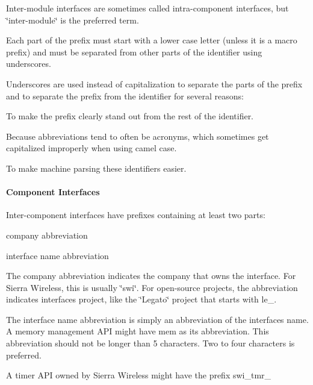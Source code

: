 Inter-\/module interfaces are sometimes called intra-\/component interfaces, but \char`\"{}inter-\/module\char`\"{} is the preferred term.

Each part of the prefix must start with a lower case letter (unless it is a macro prefix) and must be separated from other parts of the identifier using underscores.

Underscores are used instead of capitalization to separate the parts of the prefix and to separate the prefix from the identifier for several reasons\+:


\begin{DoxyItemize}
\item To make the prefix clearly stand out from the rest of the identifier.
\item Because abbreviations tend to often be acronyms, which sometimes get capitalized improperly when using camel case.
\item To make machine parsing these identifiers easier.
\end{DoxyItemize}\hypertarget{ccoding_stds_naming_cstdsInterComponentInterfaces}{}\paragraph{Component Interfaces}\label{ccoding_stds_naming_cstdsInterComponentInterfaces}
Inter-\/component interfaces have prefixes containing at least two parts\+:


\begin{DoxyItemize}
\item company abbreviation
\item interface name abbreviation
\end{DoxyItemize}

The company abbreviation indicates the company that owns the interface. For Sierra Wireless, this is usually \char`\"{}swi\char`\"{}. For open-\/source projects, the abbreviation indicates interface\textquotesingle{}s project, like the \char`\"{}\+Legato\char`\"{} project that starts with {\ttfamily le\+\_\+}.

The interface name abbreviation is simply an abbreviation of the interface\textquotesingle{}s name. A memory management A\+P\+I might have {\ttfamily mem} as its abbreviation. This abbreviation should not be longer than 5 characters. Two to four characters is preferred.

A timer A\+P\+I owned by Sierra Wireless might have the prefix {\ttfamily swi\+\_\+tmr\+\_\+} 


